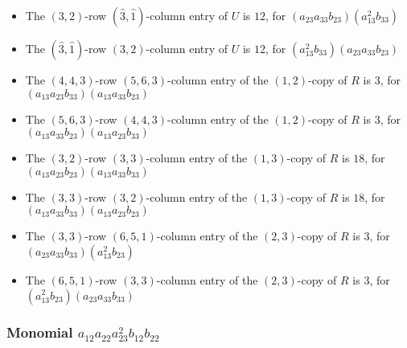 \documentclass{article}
\begin{document}
\begin{itemize}
\item The $ \left(3, 2\right) $-row $ (\hat{3}, \hat{1}) $-column entry of $U$ is $ 12 $, for $( a_{23} a_{33} b_{23} )( a_{13}^{2} b_{33} )$ 
\item The $(\hat{3}, \hat{1})$-row $ \left(3, 2\right) $-column entry of $U$ is $ 12 $, for $( a_{13}^{2} b_{33} )( a_{23} a_{33} b_{23} )$ 
\item The $(4, 4, 3)$-row $(5, 6, 3)$-column entry of the $ \left(1, 2\right) $-copy of $R$ is $ 3 $, for $( a_{13} a_{23} b_{33} )( a_{13} a_{33} b_{23} )$ 
\item The $(5, 6, 3)$-row $(4, 4, 3)$-column entry of the $ \left(1, 2\right) $-copy of $R$ is $ 3 $, for $( a_{13} a_{33} b_{23} )( a_{13} a_{23} b_{33} )$ 
\item The $(3, 2)$-row $(3, 3)$-column entry of the $ \left(1, 3\right) $-copy of $R$ is $ 18 $, for $( a_{13} a_{23} b_{23} )( a_{13} a_{33} b_{33} )$ 
\item The $(3, 3)$-row $(3, 2)$-column entry of the $ \left(1, 3\right) $-copy of $R$ is $ 18 $, for $( a_{13} a_{33} b_{33} )( a_{13} a_{23} b_{23} )$ 
\item The $(3, 3)$-row $(6, 5, 1)$-column entry of the $ \left(2, 3\right) $-copy of $R$ is $ 3 $, for $( a_{23} a_{33} b_{33} )( a_{13}^{2} b_{23} )$ 
\item The $(6, 5, 1)$-row $(3, 3)$-column entry of the $ \left(2, 3\right) $-copy of $R$ is $ 3 $, for $( a_{13}^{2} b_{23} )( a_{23} a_{33} b_{33} )$ 
\end{itemize}
\subsubsection{Monomial $ a_{12} a_{22} a_{23}^{2} b_{12} b_{22} $}
\end{document}
